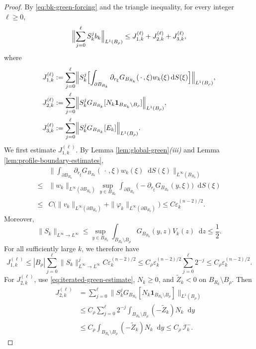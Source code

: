 \documentclass[11pt]{article}
\numberwithin{equation}{section}
\theoremstyle{remark}
\newcommand{\dd}{\mathop{}\!\mathrm{d}}
\begin{document}
\begin{proof}
 By \eqref{eq:bk-green-forcing} and the triangle inequality, for every
integer $\ell\ge0$,
{
\[
 \Bigl\|\sum_{j=0}^{\ell}S_k^jb_k\Bigr\|_{L^1(B_\rho)}
 \le J_{1,k}^{(\ell)}+J_{2,k}^{(\ell)}+J_{3,k}^{(\ell)},
\]
}
where
{
\[
\begin{aligned}
 J_{1,k}^{(\ell)}
 &:=\sum_{j=0}^{\ell}
 \Bigl\|S_k^j\Bigl[
 \int_{\partial B_{R_k}}
 \partial_{r_\xi}G_{B_{R_k}}(\,\cdot\,,\xi)
 w_k(\xi)\dd S(\xi)\Bigr]\Bigr\|_{L^1(B_\rho)},\\
 J_{2,k}^{(\ell)}
 &:=\sum_{j=0}^{\ell}
 \Bigl\|S_k^jG_{B_{R_k}}
 [N_k\mathbf 1_{B_{R_k}\setminus B_\rho}]
 \Bigr\|_{L^1(B_\rho)},\\
 J_{3,k}^{(\ell)}
 &:=\sum_{j=0}^{\ell}
 \Bigl\|S_k^jG_{B_{R_k}}[E_k]
 \Bigr\|_{L^1(B_\rho)}.
\end{aligned}
\]
}
 We first estimate $J_{1,k}^{(\ell)}$.  By
Lemma  \ref{lem:global-green}\emph{(iii)} and
Lemma  \ref{lem:profile-boundary-estimates},
{
\[
\begin{aligned}
 &\bigg\|\int_{\partial B_{R_k}}
 \partial_{r_\xi}G_{B_{R_k}}(\,\cdot\,,\xi)w_k(\xi)\dd S(\xi)
 \bigg\|_{L^\infty(B_{R_k})}\\
 {}\le{}&
 \|w_k\|_{L^\infty(\partial B_{R_k})}
 \sup_{y\in B_{R_k}}
 \int_{\partial B_{R_k}}
 \bigl(-\partial_{r_\xi}G_{B_{R_k}}(y,\xi)\bigr)\dd S(\xi)\\
 {}\le{}&C\bigl(
 \|v_k\|_{L^\infty(\partial B_{R_k})}
 +\|\varphi_k\|_{L^\infty(\partial B_{R_k})}\bigr)
 \le C\varepsilon_k^{(n-2)/2}.
\end{aligned}
\]
}
 Moreover,
{
\[
 \|S_k\|_{L^\infty\to L^\infty}
 \le\sup_{y\in B_{R_k}}
 \int_{B_{R_k}\setminus B_\rho}
 G_{B_{R_k}}(y,z)V_k(z)\dd z
 \le\frac12.
\]
}
 For all sufficiently large $k$, we therefore have
{
\[
 J_{1,k}^{(\ell)}
 \le |B_\rho|\sum_{j=0}^{\ell}
 \|S_k\|_{L^\infty\to L^\infty}^j
 C\varepsilon_k^{(n-2)/2}
 \le C_\rho\varepsilon_k^{(n-2)/2}
 \sum_{j=0}^{\ell}2^{-j}\le C_\rho\varepsilon_k^{(n-2)/2}.
\]
}
For  $J_{2,k}^{(\ell)}$, use \eqref{eq:iterated-green-estimate},
$N_k\ge0$, and $\widetilde Z_k<0$ on
$B_{R_k}\setminus B_\rho$.  Then
{
\[
\begin{aligned}
 J_{2,k}^{(\ell)}
 &=\sum_{j=0}^{\ell}
 \Big\|S_k^jG_{B_{R_k}}
 [N_k\mathbf 1_{B_{R_k}\setminus B_\rho}]
 \Big\|_{L^1(B_\rho)}\\
 &\le C_\rho\sum_{j=0}^{\ell}2^{-j}
 \int_{B_{R_k}\setminus B_\rho}(-\widetilde Z_k)N_k\dd y\\
 &\le C_\rho
 \int_{B_{R_k}\setminus B_\rho}(-\widetilde Z_k)N_k\dd y
 \le C_\rho\,\mathcal I_k^-.
\end{aligned}
\]}
\end{proof}
\end{document}
